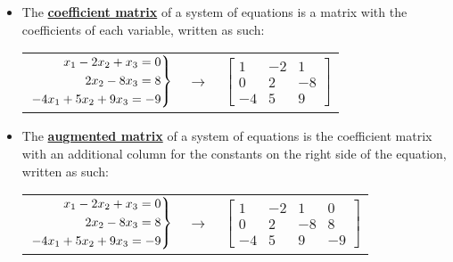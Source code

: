 \documentclass{article}
\newcommand{\definition}[1]{\underline{\textbf{#1}}}
\newenvironment{rcases}
  {\left.\begin{aligned}}
  {\end{aligned}\right\rbrace}
\begin{document}
\begin{itemize}
    \item The \definition{coefficient matrix} of a system of equations is a matrix with the coefficients of each variable, written as such: \\
    \begin{center}
        \begin{tabular}{c c c}

            $\begin{rcases}
            x_1 - 2x_2 + x_3 = 0 \\  
            2x_2 - 8x_3 = 8 \\
            -4x_1 + 5x_2 + 9x_3 = -9 \\ 
            \end{rcases}$

            & $\rightarrow$ &

            $\begin{bmatrix}
                1 & -2 & 1 \\
                0 & 2 & -8 \\
                -4 & 5 & 9 
            \end{bmatrix}$

        \end{tabular}
    \end{center}

    \item The \definition{augmented matrix} of a system of equations is the coefficient matrix with an additional column for the constants on the right side of the equation, written as such:\\
    \begin{center}
        \begin{tabular}{c c c}

            $\begin{rcases}
            x_1 - 2x_2 + x_3 = 0 \\  
            2x_2 - 8x_3 = 8 \\
            -4x_1 + 5x_2 + 9x_3 = -9 \\ 
            \end{rcases}$

            & $\rightarrow$ &

            $\begin{bmatrix}
                1 & -2 & 1 & 0 \\
                0 & 2 & -8 & 8 \\
                -4 & 5 & 9 & -9
            \end{bmatrix}$


\end{tabular}
\end{center}
\end{itemize}
\end{document}
